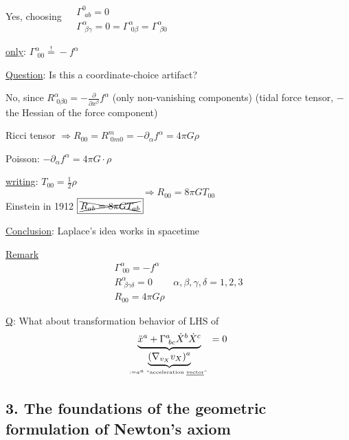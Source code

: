 	Yes, choosing $\begin{aligned} & \quad \\
	& \Gamma^0_{ \, \, ab} = 0 \\
	& \Gamma^{\alpha}_{ \, \, \beta \gamma} = 0 =\Gamma^{\alpha}_{\,\, 0\beta} = \Gamma^{\alpha}_{ \, \, \beta 0}\end{aligned}$
	
	\underline{only}: $\boxed{ \Gamma^{\alpha}_{ \, \, 00} \overset{!}{=} -f^{\alpha}}$
	
	\underline{Question}: Is this a coordinate-choice artifact?
	
	No, since $R^{\alpha}_{ \, \, 0\beta 0} = - \frac{ \partial }{ \partial x^{\beta}} f^{\alpha}$ (only non-vanishing components) (tidal force tensor, $-$ the Hessian of the force component)
	
	Ricci tensor $\Longrightarrow  R_{00} = R^m_{ \, \, 0m0} = -\partial_{\alpha} f^{\alpha} = 4\pi G \rho$
	
	Poisson: $-\partial_{\alpha}f^{\alpha} = 4\pi G\cdot \rho$
	
	\underline{writing}: $T_{00} = \frac{1}{2} \rho$ 
	\[
	\Longrightarrow \boxed{ R_{00} = 8 \pi G T_{00} }
	\]
	Einstein in 1912 $ \boxed{ \xcancel{ R_{ab} = 8\pi G T_{ab} }}$
	
	
	\underline{Conclusion}: Laplace's idea works in spacetime
	
	\underline{Remark} 
	\[
	\begin{gathered}
	\Gamma^{\alpha}_{ \, \, 00 } = -f^{\alpha} \\ 
	R^{\alpha}_{ \, \, \beta \gamma \delta } = 0 \quad \quad \, \alpha, \beta , \gamma, \delta = 1,2,3 \\
	\boxed{ R_{00} = 4\pi G \rho }
	\end{gathered}
	\]
	
	\underline{Q}: What about transformation behavior of LHS of 
	\[
	\underbrace{ \ddot{x}^a + \Gamma^a_{ \, \, bc } \dot{X}^b \dot{X}^c}_{ \underbrace{ (\nabla_{v_X}v_X)^a}_{ := a^a \text{ ``acceleration \underline{vector}'' } } } = 0
	\]
	
	\subsection*{3. The foundations of the geometric formulation of Newton's axiom}
	
